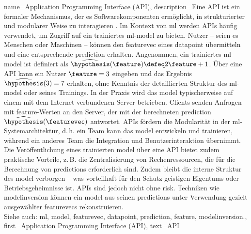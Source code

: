 {{{{ 
{name={Application Programming Interface (API)},
		description={Eine API ist ein formaler Mechanismus, 
			der es Softwarekomponenten ermöglicht, in strukturierter und modularer Weise zu interagieren \cite{RestfulBook2013}.
			Im Kontext von \gls{ml} werden APIs häufig verwendet, um Zugriff auf ein trainiertes \gls{ml}-\gls{model} zu bieten. 
			Nutzer – seien es Menschen oder Maschinen – können den \gls{featurevec} eines \gls{datapoint} übermitteln 
			und eine entsprechende \gls{prediction} erhalten. Angenommen, ein trainiertes \gls{ml}-\gls{model} ist definiert als 
			$\widehat{\hypothesis}(\feature) \defeq 2 \feature + 1$. Über eine API kann ein Nutzer 
			$\feature = 3$ eingeben und das Ergebnis $\widehat{\hypothesis}(3) = 7$ erhalten, 
			ohne Kenntnis der detaillierten Struktur des \gls{ml}-\gls{model} oder seines Trainings. 
			In der Praxis wird das \gls{model} typischerweise auf einem mit dem Internet verbundenen Server betrieben. 
			Clients senden Anfragen mit \gls{feature}-Werten an den Server, der mit der berechneten \gls{prediction} 
			$\widehat{\hypothesis}(\featurevec)$ antwortet. APIs fördern die Modularität in der \gls{ml}-Systemarchitektur, 
			d.\,h. ein Team kann das \gls{model} entwickeln und trainieren, während ein anderes Team die Integration und Benutzerinteraktion übernimmt. 
			Die Veröffentlichung eines trainierten \gls{model} über eine API bietet zudem praktische Vorteile, 
			z.\,B. die Zentralisierung von Rechenressourcen, die für die Berechnung von \glspl{prediction} erforderlich sind. 
			Zudem bleibt die interne Struktur des \gls{model} verborgen – was vorteilhaft für den Schutz geistigen Eigentums oder Betriebsgeheimnisse ist. 
			APIs sind jedoch nicht ohne \gls{risk}. Techniken wie \gls{modelinversion} können ein 
			\gls{model} aus seinen \glspl{prediction} unter Verwendung gezielt ausgewählter \glspl{featurevec} rekonstruieren.
					\\
			Siehe auch: \gls{ml}, \gls{model}, \gls{featurevec}, \gls{datapoint}, \gls{prediction}, \gls{feature}, \gls{modelinversion}.},
		first={Application Programming Interface (API)},
		text={API}
}

}}}}
